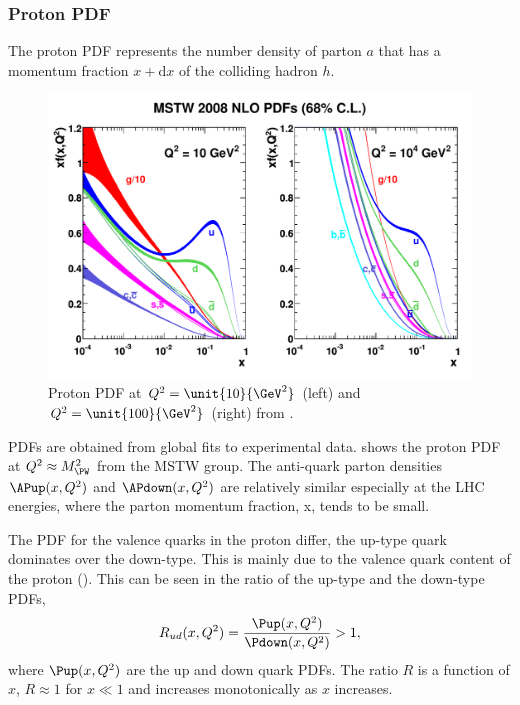 \subsubsection*{Proton \acl{PDF}} 
The proton \ac{PDF} represents the number density of parton $a$ that has a momentum
fraction $x+\mathrm{d}x$ of the colliding hadron $h$.  


\begin{figure}[htbp]
  \centering
  \includegraphics[width=\textwidth]{mstw2008nlo68cl_allpdfs}
  \caption{Proton PDF at  $ Q^2 = \unit{ 10  }{\GeV^2} $ (left) 
                      and $ Q^2 = \unit{ 100  }{\GeV^2} $ (right) 
                     from \cite{Martin:2009iq}. }
  \label{wbos:pdf}
\end{figure}

\acp{PDF} are obtained
from global fits to experimental data.\cite{Martin:2009iq} %
 shows the proton PDF at $Q^2\approx M_{\PW}^2$ from the
MSTW group.
The anti-quark parton densities $\APup(x,Q^2)$ and $\APdown(x,Q^2)$ are
relatively similar especially at the LHC energies, where the parton momentum
fraction, x, tends to be small.

The \ac{PDF} for the valence quarks in the proton differ, the up-type quark
dominates over the down-type. This is mainly due to the valence quark content
of the proton (\HepProcess{\Pup\Pup\Pdown}).  This can be seen in the
ratio of the up-type and the down-type \acp{PDF},
\begin{equation}
  R_{ud}(x,Q^2) = \frac{\Pup(x,Q^2)}{ \Pdown(x,Q^2)} > 1,
\end{equation}
where $\Pup(x,Q^2)$ are the up and down quark \acp{PDF}.  
The ratio $R$ is a function of $x$, $R \approx 1$ for $x \ll 1$ and increases
monotonically as $x$ increases.  

